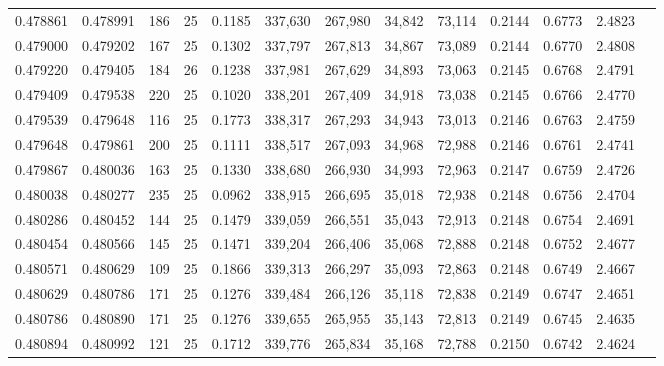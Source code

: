 \begin{tabular}{rrrrrrrrrrrrr}
0.478861 & 0.478991 &   186 &  25 &                                     0.1185 & 337,630 & 267,980 &  34,842 &  73,114 & 0.2144 & 0.6773 & 2.4823 \\
0.479000 & 0.479202 &   167 &  25 &                                     0.1302 & 337,797 & 267,813 &  34,867 &  73,089 & 0.2144 & 0.6770 & 2.4808 \\
0.479220 & 0.479405 &   184 &  26 &                                     0.1238 & 337,981 & 267,629 &  34,893 &  73,063 & 0.2145 & 0.6768 & 2.4791 \\
0.479409 & 0.479538 &   220 &  25 &                                     0.1020 & 338,201 & 267,409 &  34,918 &  73,038 & 0.2145 & 0.6766 & 2.4770 \\
0.479539 & 0.479648 &   116 &  25 &                                     0.1773 & 338,317 & 267,293 &  34,943 &  73,013 & 0.2146 & 0.6763 & 2.4759 \\
0.479648 & 0.479861 &   200 &  25 &                                     0.1111 & 338,517 & 267,093 &  34,968 &  72,988 & 0.2146 & 0.6761 & 2.4741 \\
0.479867 & 0.480036 &   163 &  25 &                                     0.1330 & 338,680 & 266,930 &  34,993 &  72,963 & 0.2147 & 0.6759 & 2.4726 \\
0.480038 & 0.480277 &   235 &  25 &                                     0.0962 & 338,915 & 266,695 &  35,018 &  72,938 & 0.2148 & 0.6756 & 2.4704 \\
0.480286 & 0.480452 &   144 &  25 &                                     0.1479 & 339,059 & 266,551 &  35,043 &  72,913 & 0.2148 & 0.6754 & 2.4691 \\
0.480454 & 0.480566 &   145 &  25 &                                     0.1471 & 339,204 & 266,406 &  35,068 &  72,888 & 0.2148 & 0.6752 & 2.4677 \\
0.480571 & 0.480629 &   109 &  25 &                                     0.1866 & 339,313 & 266,297 &  35,093 &  72,863 & 0.2148 & 0.6749 & 2.4667 \\
0.480629 & 0.480786 &   171 &  25 &                                     0.1276 & 339,484 & 266,126 &  35,118 &  72,838 & 0.2149 & 0.6747 & 2.4651 \\
0.480786 & 0.480890 &   171 &  25 &                                     0.1276 & 339,655 & 265,955 &  35,143 &  72,813 & 0.2149 & 0.6745 & 2.4635 \\
0.480894 & 0.480992 &   121 &  25 &                                     0.1712 & 339,776 & 265,834 &  35,168 &  72,788 & 0.2150 & 0.6742 & 2.4624 \\

\end{tabular}
